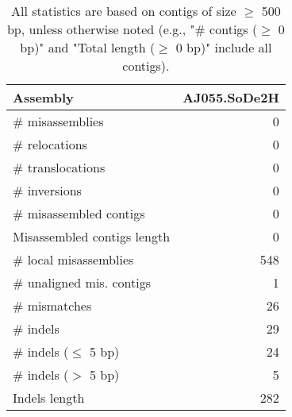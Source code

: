 \documentclass[12pt,a4paper]{article}
\begin{document}
\begin{table}[ht]
\begin{center}
\caption{All statistics are based on contigs of size $\geq$ 500 bp, unless otherwise noted (e.g., "\# contigs ($\geq$ 0 bp)" and "Total length ($\geq$ 0 bp)" include all contigs).}
\begin{tabular}{|l*{1}{|r}|}
\hline
Assembly & AJ055.SoDe2H \\ \hline
\# misassemblies & 0 \\ \hline
\hspace{5mm}\# relocations & 0 \\ \hline
\hspace{5mm}\# translocations & 0 \\ \hline
\hspace{5mm}\# inversions & 0 \\ \hline
\# misassembled contigs & 0 \\ \hline
Misassembled contigs length & 0 \\ \hline
\# local misassemblies & 548 \\ \hline
\# unaligned mis. contigs & 1 \\ \hline
\# mismatches & 26 \\ \hline
\# indels & 29 \\ \hline
\hspace{5mm}\# indels ($\leq$ 5 bp) & 24 \\ \hline
\hspace{5mm}\# indels ($>$ 5 bp) & 5 \\ \hline
Indels length & 282 \\ \hline
\end{tabular}
\end{center}
\end{table}
\end{document}
